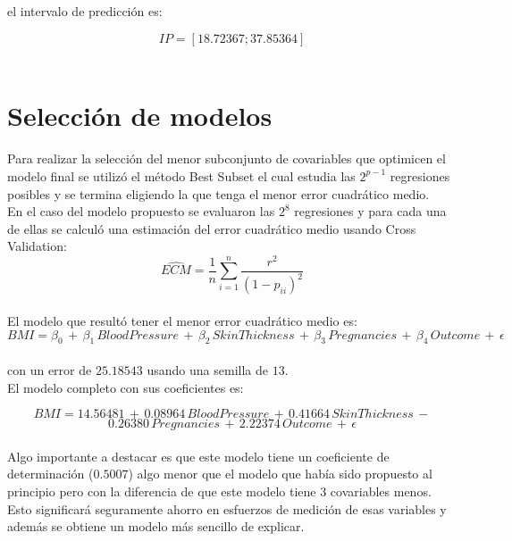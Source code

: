\documentclass{article}
\begin{document}
\noindent
el intervalo de predicción es:

$$IP = [18.72367; 37.85364]$$\\





\section{Selección de modelos}

\noindent
Para realizar la selección del menor subconjunto de covariables que optimicen el modelo final se utilizó el método Best Subset el cual estudia las \(2^{p-1}\) regresiones posibles y se termina eligiendo la que tenga el menor error cuadrático medio.\\

\noindent
En el caso del modelo propuesto se evaluaron las \(2^{8}\) regresiones y para cada una de ellas se calculó una estimación del error cuadrático medio usando Cross Validation:\\

$$\widehat{ECM} = \frac{1}{n} \sum_{i=1}^{n} \frac{r^2}{(1 - p_{ii})^2}$$\\

\noindent
El modelo que resultó tener el menor error cuadrático medio es:\\

$$BMI = \beta_0 \, + \, \beta_1 \, BloodPressure \, + \, \beta_2 \, SkinThickness \,
+ \, \beta_3 \, Pregnancies \, + \, \beta_4 \, Outcome \, + \, \epsilon $$\\

\noindent
con un error de \(25.18543\) usando una semilla de \(13\).\\

\noindent
El modelo completo con sus coeficientes es:

$$BMI = 14.56481 \, + \, 0.08964 \, BloodPressure \, + \, 0.41664 \, SkinThickness \,
- $$
$$0.26380 \, Pregnancies \, + \, 2.22374 \, Outcome \, + \, \epsilon $$\\

\noindent
Algo importante a destacar es que este modelo tiene un coeficiente de determinación (\(0.5007\)) algo menor que el modelo que había sido propuesto al principio pero con la diferencia de que este modelo tiene 3 covariables menos. Esto significará seguramente ahorro en esfuerzos de medición de esas variables y además se obtiene un modelo más sencillo de explicar.\\
\end{document}

